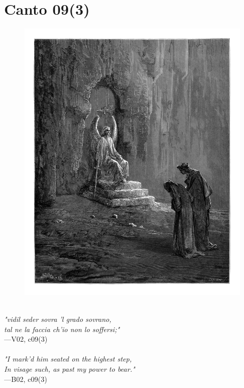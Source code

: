 \documentclass[../Dore_vision.tex]{subfiles}
\begin{document}
\newpage

\section{Canto 09(3)}

\begin{figure}[ht]
\centering
\includegraphics[height=\figsize]{illustrations/book_2/V02, c09(3).jpg}
\end{figure}

\begin{center}
\begin{minipage}{0.8\linewidth}
\textit{\\
"vidil seder sovra ’l grado sovrano,\\tal ne la faccia ch’io non lo soffersi;"} \\
—V02, c09(3) \\~\\
\textit{"I mark'd him seated on the highest step,\\In visage such, as past my power to bear."} \\
—B02, c09(3)
\end{minipage}
\end{center}
\end{document}
